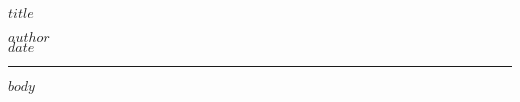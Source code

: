 \documentclass[11pt]{article}
\begin{document}
\parbox[c]{250pt}{ {\huge $title$} }                                              
\hfill
\parbox[c]{100pt}{ $author$ \\ $date$ }

\vspace{1em}
\hrule
\vspace{1em}

$body$
\end{document}
